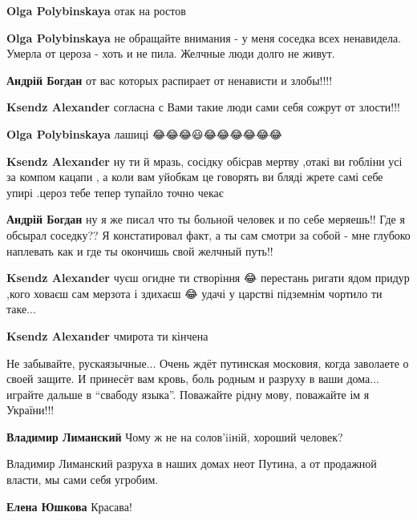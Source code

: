 \begin{itemize}
{\begin{itemize}
\textbf{Olga Polybinskaya} отак на ростов \Laughey[1.0]\Laughey[1.0]\Laughey[1.0]


\textbf{Olga Polybinskaya} не обращайте внимания - у меня соседка всех
ненавидела. Умерла от цероза - хоть и не пила. Желчные люди долго не живут.

\textbf{Андрій Богдан} от вас которых распирает от ненависти и злобы!!!!

\textbf{Ksendz Alexander} согласна с Вами такие люди сами себя сожрут от злости!!!

\textbf{Olga Polybinskaya} лашиці \Laughey[1.0]\Laughey[1.0]\Laughey[1.0]😂😂😂😃😂😂😂😂😂😂

\textbf{Ksendz Alexander} ну ти й мразь, сосідку обісрав мертву ,отакі ви гобліни усі за компом кацапи , а коли вам уйобкам це говорять ви бляді жрете самі себе упирі .цероз тебе тепер тупайло точно чекає \Laughey[1.0]\Laughey[1.0]\Laughey[1.0]

\textbf{Андрій Богдан} ну я же писал что ты больной человек и по себе меряешь!! Где я обсырал соседку?? Я констатировал факт, а ты сам смотри за собой - мне глубоко наплевать как и где ты окончишь свой желчный путь!!

\textbf{Ksendz Alexander} чуєш огидне ти створіння 😂 перестань ригати ядом придур ,кого ховаєш сам мерзота і здихаєш 😂 удачі у царстві підземнім чортило ти таке...

\textbf{Ksendz Alexander} чмирота ти кінчена \Laughey[1.0]\Laughey[1.0]\Laughey[1.0]
\end{itemize}


Не забывайте, рускаязычные... Очень ждёт путинская московия, когда заволаете о
своей защите. И принесёт вам кровь, боль родным и разруху в ваши дома...
играйте дальше в \enquote{свабоду языка}. Поважайте рідну мову, поважайте ім я
України!!!

\begin{itemize}
\textbf{Владимир Лиманский} Чому ж не на солов'iiнiй, хороший человек?

Владимир Лиманский разруха в наших домах неот Путина, а от продажной власти, мы сами себя угробим.

\textbf{Елена Юшкова} Красава!


\end{itemize}}
\end{itemize}
